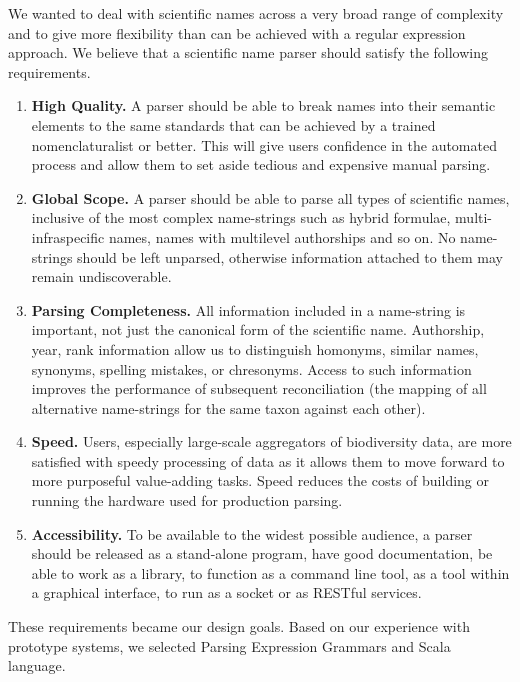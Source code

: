 \documentclass{bmcart}
\begin{document}
We wanted to deal with scientific names across a very broad range of complexity and to give more flexibility than can be achieved with a regular expression approach. We believe that a scientific name parser should satisfy the following requirements.

\begin{enumerate}

  \item \textbf{High Quality.} A parser should be able to break names into their semantic elements to the same standards that can be achieved by a trained nomenclaturalist or better. This will give users confidence in the automated process and allow them to set aside tedious and expensive manual parsing.

  \item \textbf{Global Scope.} A parser should be able to parse all types of scientific names, inclusive of the most complex name-strings such as hybrid formulae, multi-infraspecific names, names with multilevel authorships and so on. No name-strings should be left unparsed, otherwise information attached to them may remain undiscoverable.

  \item \textbf{Parsing Completeness.} All information included in a name-string is important, not just the canonical form of the scientific name. Authorship, year, rank information allow us to distinguish homonyms, similar names, synonyms, spelling mistakes, or chresonyms. Access to such information improves the performance of subsequent reconciliation (the mapping of all alternative name-strings for the same taxon against each other).

  \item \textbf{Speed.} Users, especially large-scale aggregators of biodiversity data, are more satisfied with speedy processing of data as it allows them to move forward to more purposeful value-adding tasks. Speed reduces the costs of building or running the hardware used for production parsing.

  \item \textbf{Accessibility.} To be available to the widest possible audience, a parser should be released as a stand-alone program, have good documentation, be able to work as a library, to function as a command line tool, as a tool within a graphical interface, to run as a socket or as RESTful services.

\end{enumerate}

These requirements became our design goals. Based on our experience with prototype systems, we selected Parsing Expression Grammars and Scala language.
\end{document}
